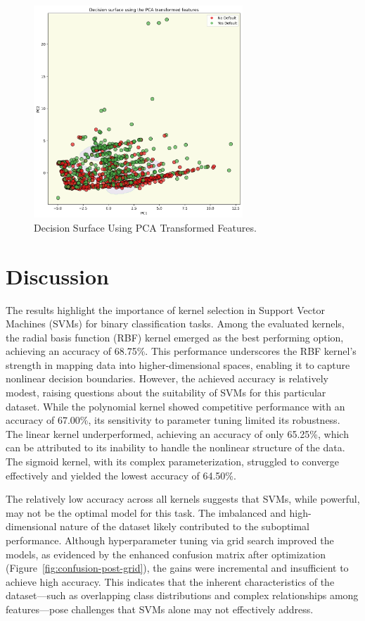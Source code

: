 \documentclass{article}
\begin{document}
\begin{figure}[H]
    \centering
    \includegraphics[width=0.7\textwidth]{../figures/decision_surface_pca.png}
    \caption{Decision Surface Using PCA Transformed Features.}
    \label{fig:decision-surface}
\end{figure}

\section{Discussion}
The results highlight the importance of kernel selection in Support Vector Machines (SVMs) for binary classification tasks. Among the evaluated kernels, the radial basis function (RBF) kernel emerged as the 
best performing option, achieving an accuracy of 68.75\%. This performance underscores the RBF kernel's strength in mapping data into higher-dimensional spaces, enabling it to capture nonlinear decision boundaries. 
However, the achieved accuracy is relatively modest, raising questions about the suitability of SVMs for this particular dataset. While the polynomial kernel showed competitive performance with an accuracy of 67.00\%, 
its sensitivity to parameter tuning limited its robustness. The linear kernel underperformed, achieving an accuracy of only 65.25\%, which can be attributed to its inability to handle the nonlinear structure of the data. 
The sigmoid kernel, with its complex parameterization, struggled to converge effectively and yielded the lowest accuracy of 64.50\%.

The relatively low accuracy across all kernels suggests that SVMs, while powerful, may not be the optimal model for this task. The imbalanced and high-dimensional nature of the dataset likely contributed to the suboptimal performance. 
Although hyperparameter tuning via grid search improved the models, as evidenced by the enhanced confusion matrix after optimization (Figure~\ref{fig:confusion-post-grid}), the gains were incremental and insufficient to achieve high accuracy. 
This indicates that the inherent characteristics of the dataset—such as overlapping class distributions and complex relationships among features—pose challenges that SVMs alone may not effectively address.
\end{document}
